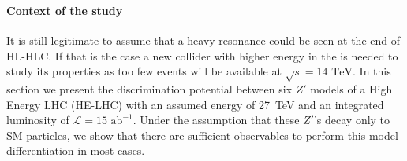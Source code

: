 \subsubsection{}

\newcommand*{\sqrtslhc}{\ensuremath{\sqrt{s}=\text{14 TeV}}}
\newcommand*{\sqrtshelhc}{\ensuremath{\sqrt{s}=\text{27 TeV}}}
\renewcommand*{\intlumihelhc}{\ensuremath{\mathcal{L}=15\text{ ab}^{-1}}}
\newcommand*{\intlumihllhc}{\ensuremath{\mathcal{L}=3\text{ ab}^{-1}}}


\paragraph*{Context of the study}
It is still legitimate to assume that a heavy resonance could be seen at the end of HL-HLC. If that is the case a new collider with higher energy
in the \com is needed to study its properties as too few events will be available at \sqrtslhc. In this section we present the discrimination potential between six $Z'$ models of a High Energy LHC (HE-LHC) with an assumed \com energy of 27~TeV and an integrated luminosity of \intlumihelhc. Under the assumption that these $Z'$'s decay only to SM particles, we show that there are sufficient observables to perform this model differentiation in most cases.

